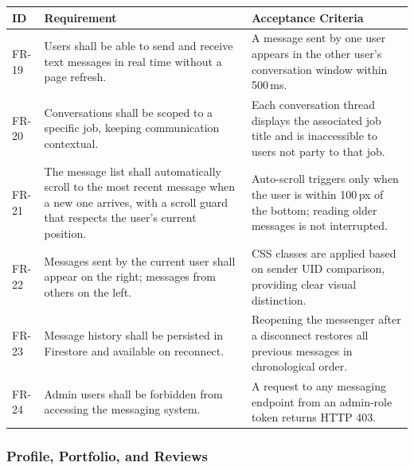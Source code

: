 \documentclass[11pt]{article}
\begin{document}
\begin{longtable}{@{}p{1.8cm}p{5.8cm}p{5.8cm}@{}}
\toprule
\textbf{ID} & \textbf{Requirement} & \textbf{Acceptance Criteria} \\
\midrule
\endhead
FR-19 & Users shall be able to send and receive text messages in real time without a page refresh. & A message sent by one user appears in the other user's conversation window within 500\,ms. \\
\midrule
FR-20 & Conversations shall be scoped to a specific job, keeping communication contextual. & Each conversation thread displays the associated job title and is inaccessible to users not party to that job. \\
\midrule
FR-21 & The message list shall automatically scroll to the most recent message when a new one arrives, with a scroll guard that respects the user's current position. & Auto-scroll triggers only when the user is within 100\,px of the bottom; reading older messages is not interrupted. \\
\midrule
FR-22 & Messages sent by the current user shall appear on the right; messages from others on the left. & CSS classes are applied based on sender UID comparison, providing clear visual distinction. \\
\midrule
FR-23 & Message history shall be persisted in Firestore and available on reconnect. & Reopening the messenger after a disconnect restores all previous messages in chronological order. \\
\midrule
FR-24 & Admin users shall be forbidden from accessing the messaging system. & A request to any messaging endpoint from an admin-role token returns HTTP 403. \\
\bottomrule
\end{longtable}

\subsubsection{Profile, Portfolio, and Reviews}
\end{document}
